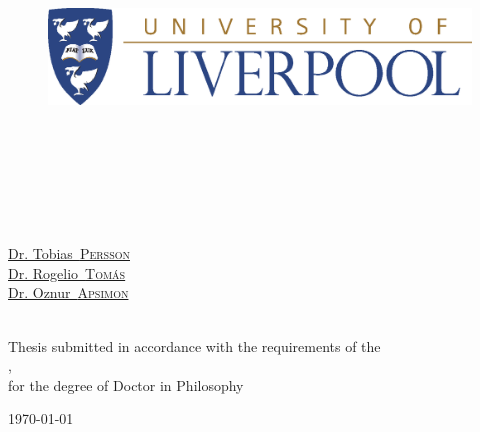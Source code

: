 \begin{titlepage}
\begin{center}

\vspace*{.06\textheight}
\vspace{1cm}
{\scshape\LARGE \univname\par} %
\vspace{0.8cm}

\begin{figure}[ht]
    \centering
    \includegraphics[width=\textwidth]{Figures/Logos/UoLlogo.eps}
\end{figure}

\HRule \\[0.4cm] %
{\huge \bfseries \ttitle\par}\vspace{0.4cm} %
\HRule \\[1cm] %

\vspace{1cm}

\begin{minipage}[t]{0.4\textwidth}
\begin{flushleft} \large
{}\\
\href{https://orcid.org/my-orcid?orcid=0000-0001-8012-1440}{\authorname} %
\end{flushleft}
\end{minipage}
\begin{minipage}[t]{0.4\textwidth}
\begin{flushright} \large
{}\\
\href{https://www.researchgate.net/profile/Tobias-Persson}{Dr. Tobias~\textsc{Persson}}\\
\href{https://orcid.org/0000-0002-9857-1703}{Dr. Rogelio~\textsc{Tomás}}\\
\href{https://orcid.org/0000-0002-5410-7706}{Dr. Oznur~\textsc{Apsimon}}\\
\href{https://orcid.org/0000-0001-7085-0973}{\supname}\\
\end{flushright}
\end{minipage}

\vspace{1.5cm}

\vfill

\large {Thesis submitted in accordance with the requirements of the\\}
\univname, \deptname \\
\large {for the degree of Doctor in Philosophy}

\vfill

{\large \today}\\[4.5cm] %

\vfill
\end{center}
\end{titlepage}